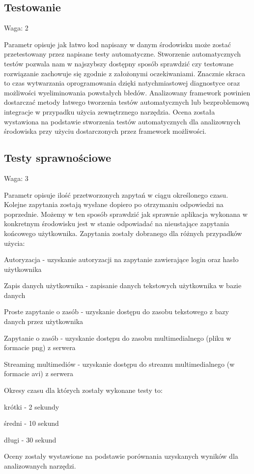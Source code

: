 \documentclass[12pt]{report}
\begin{document}
    \subsection{Testowanie}
      \begin{description}
        \item Waga: 2
      \end{description}
      Parametr opisuje jak łatwo kod napisany w danym środowisku może zostać przetestowany przez napisane testy automatyczne.
      Stworzenie automatycznych testów pozwala nam w najszybszy dostępny sposób sprawdzić czy testowane rozwiązanie zachowuje się zgodnie z założonymi oczekiwaniami.
      Znacznie skraca to czas wytwarzania oprogramowania dzięki natychmiastowej diagnostyce oraz możliwości wyeliminowania powstałych błedów.
      Analizowany framework powinien dostarczać metody łatwego tworzenia testów automatycznych lub bezproblemową integracje w przypadku użycia zewnętrznego narzędzia.
      Ocena została wystawiona na podstawie stworzenia testów automatycznych dla analizownych środowiska przy użyciu dostarczonych przez framework możliwości.

    \subsection{Testy sprawnościowe}
      \begin{description}
        \item Waga: 3
      \end{description}
      Parametr opisuje ilość przetworzonych zapytań w ciągu określonego czasu.
      Kolejne zapytania zostają wysłane dopiero po otrzymaniu odpowiedzi na poprzednie.
      Możemy w ten sposób sprawdzić jak sprawnie aplikacja wykonana w konkretnym środowisku jest w stanie odpowiadać na nieustające zapytania końcowego użytkownika.
      Zapytania zostały dobranego dla różnych przypadków użycia:
      \begin{description}
        \item Autoryzacja - uzyskanie autoryzacji na zapytanie zawierające login oraz hasło użytkownika
        \item Zapis danych użytkownika - zapisanie danych tekstowych użytkownika w bazie danych
        \item Proste zapytanie o zasób - uzyskanie dostępu do zasobu tekstowego z bazy danych przez użytkownika
        \item Zapytanie o zasób - uzyskanie dostępu do zasobu multimedialnego (pliku w formacie png) z serwera
        \item Streaming multimediów - uzyskanie dostępu do streamu multimedialnego (w formacie avi) z serwera
      \end{description}
      Okresy czasu dla których zostały wykonane testy to:
      \begin{description}
        \item krótki - 2 sekundy
        \item średni - 10 sekund
        \item długi - 30 sekund
      \end{description}
      Oceny zostały wystawione na podstawie porównania uzyskanych wyników dla analizowanych narzędzi.
      
\end{document}
